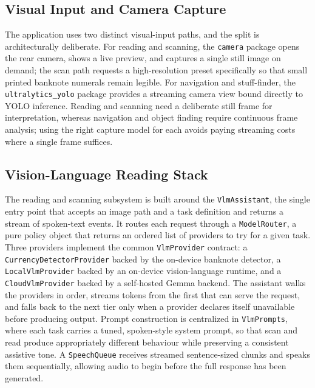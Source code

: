 \documentclass[12pt,a4paper]{report}
\begin{document}
\subsection{Visual Input and Camera Capture}
The application uses two distinct visual-input paths, and the split is architecturally deliberate. For reading and scanning, the \texttt{camera} package opens the rear camera, shows a live preview, and captures a single still image on demand; the scan path requests a high-resolution preset specifically so that small printed banknote numerals remain legible. For navigation and stuff-finder, the \texttt{ultralytics\_yolo} package provides a streaming camera view bound directly to YOLO inference. Reading and scanning need a deliberate still frame for interpretation, whereas navigation and object finding require continuous frame analysis; using the right capture model for each avoids paying streaming costs where a single frame suffices.

\subsection{Vision-Language Reading Stack}
The reading and scanning subsystem is built around the \texttt{VlmAssistant}, the single entry point that accepts an image path and a task definition and returns a stream of spoken-text events. It routes each request through a \texttt{ModelRouter}, a pure policy object that returns an ordered list of providers to try for a given task. Three providers implement the common \texttt{VlmProvider} contract: a \texttt{CurrencyDetectorProvider} backed by the on-device banknote detector, a \texttt{LocalVlmProvider} backed by an on-device vision-language runtime, and a \texttt{CloudVlmProvider} backed by a self-hosted Gemma backend. The assistant walks the providers in order, streams tokens from the first that can serve the request, and falls back to the next tier only when a provider declares itself unavailable before producing output. Prompt construction is centralized in \texttt{VlmPrompts}, where each task carries a tuned, spoken-style system prompt, so that scan and read produce appropriately different behaviour while preserving a consistent assistive tone. A \texttt{SpeechQueue} receives streamed sentence-sized chunks and speaks them sequentially, allowing audio to begin before the full response has been generated.
\end{document}
